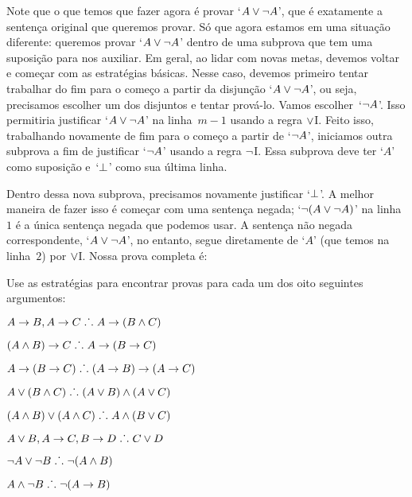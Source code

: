 Note que o que temos que fazer agora é provar `$A \vee\neg A$', que é exatamente a sentença original que queremos provar. Só que agora estamos em uma situação diferente: queremos provar `$A \vee\neg A$’  dentro de uma subprova que tem uma suposição para nos auxiliar.   Em geral, ao lidar com novas metas, devemos voltar e começar com as estratégias básicas. Nesse caso, devemos primeiro tentar trabalhar do fim para o começo a partir da disjunção `$A \vee \neg A$', ou seja, precisamos escolher um dos disjuntos  e tentar prová-lo. Vamos escolher~`$\neg A$'. Isso permitiria justificar `$A \vee \neg A$' na linha~$m - 1$ usando a regra $\vee$I. Feito isso, trabalhando novamente de fim para o começo a partir de `$\neg A$', iniciamos outra subprova a fim de justificar `$\neg A$' usando a regra  $\neg$I. Essa subprova deve ter `$A$' como suposição e~`$\bot$' como sua última linha.
\begin{fitchproof}
	\open
	\open
	\ellipsesline
	\close
	\close
\end{fitchproof}
Dentro dessa nova subprova, precisamos novamente justificar `$\bot$'. A melhor maneira de fazer isso é começar com uma sentença negada; `$\neg(A \vee \neg A)$' na linha~$1$ é a única sentença negada que podemos usar. A sentença não negada correspondente, `$A \vee \neg A$', no entanto, segue diretamente de `$A$' (que temos na linha~$2$) por $\vee$I. Nossa prova completa é:
\begin{fitchproof}
	\open
	\open
	\close
	\close
\end{fitchproof}


\practiceproblems

\problempart
Use as estratégias  para encontrar provas para cada um dos oito seguintes argumentos:
\begin{earg}
\item $A \rightarrow B, A \rightarrow C \mathrel{\ldotp\dot{}\,\ldotp} A \rightarrow (B \wedge C)$
\item $(A \wedge B) \rightarrow C \mathrel{\ldotp\dot{}\,\ldotp} A \rightarrow (B \rightarrow C)$
\item $A \rightarrow (B \rightarrow C) \mathrel{\ldotp\dot{}\,\ldotp} (A \rightarrow B) \rightarrow (A \rightarrow C)$
\item $A \vee (B \wedge C) \mathrel{\ldotp\dot{}\,\ldotp} (A \vee B) \wedge (A \vee C)$
\item $(A \wedge B) \vee (A \wedge C) \mathrel{\ldotp\dot{}\,\ldotp} A \wedge (B \vee C)$
\item $A \vee B, A \rightarrow C, B \rightarrow D \mathrel{\ldotp\dot{}\,\ldotp} C \vee D$
\item $\neg A \lor \neg B \mathrel{\ldotp\dot{}\,\ldotp} \neg(A \wedge B)$
\item $A \wedge \neg B \mathrel{\ldotp\dot{}\,\ldotp} \neg(A \rightarrow B)$
\end{earg}

